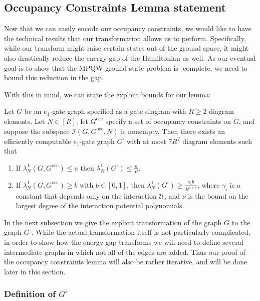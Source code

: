 \documentclass[../thesis-main/thesis-main]{subfiles}
\begin{document}
\subsection{Occupancy Constraints Lemma statement}
\label{sec:occupancy_statement}

Now that we can easily encode our occupancy constraints, we would like to have the technical results that our transformation allows us to perform.  Specifically, while our transform might raise certain states out of the ground space, it might also drastically reduce the energy gap of the Hamiltonian as well.  As our eventual goal is to show that the MPQW-ground state problem is \QMA-complete, we need to bound this reduction in the gap.  


With this in mind, we can state the explicit bounds for our lemma:
\begin{lemma}\label{lem:oc}
Let $G$ be an $e_{1}$-gate graph specified as a gate diagram with $R\geq2$ diagram elements. Let $N\in[R]$, let $G^{\text{occ}}$ specify a set of occupancy constraints on $G$, and suppose the subspace $\mathcal{I}(G,G^{\text{occ}},N)$ is nonempty. Then there exists an efficiently computable $e_{1}$-gate graph $G^{\square}$ with at most $7R^{2}$ diagram elements such that
\begin{enumerate}
\item If $\lambda_{N}^{1}(G,G^{\text{occ}})\leq a$ then $\lambda_{N}^{1}(G^{\square})\leq\frac{a}{R}$.
\item If $\lambda_{N}^{1}(G,G^{\text{occ}})\geq b$ with $b\in[0,1]$, then $\lambda_{N}^{1}(G^{\square})\geq \frac{\gamma_{\square}b}{R^{9+\nu}}$, where $\gamma_{\square}$ is a constant that depends only on the interaction $\mathcal{U}$, and $\nu$ is the bound on the largest degree of the interaction potential polynomials.
\end{enumerate}
\end{lemma}

In the next subsection we give the explicit transformation of the graph $G$ to the graph $G^{\square}$. While the actual transformation itself is not particularly complicated, in order to show how the energy gap transforms we will need to define several intermediate graphs in which not all of the edges are added.  Thus our proof of the occupancy constraints lemma will also be rather iterative, and will be done later in this section.
\subsubsection{Definition of $G^{\square}$\label{sec:g_square_def}}
\end{document}
